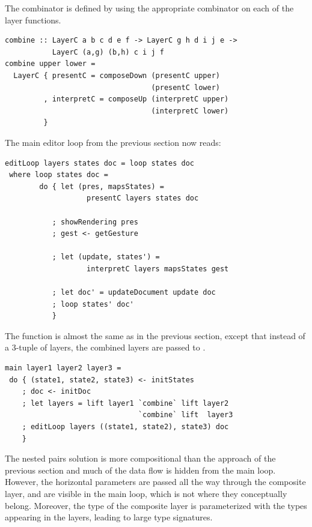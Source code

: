 \documentclass[preprint,natbib]{sigplanconf}
\begin{document}
The  combinator is defined by using the appropriate  combinator on each of the layer functions. 

\begin{small}
\begin{verbatim}
combine :: LayerC a b c d e f -> LayerC g h d i j e -> 
           LayerC (a,g) (b,h) c i j f
combine upper lower =
  LayerC { presentC = composeDown (presentC upper) 
                                  (presentC lower)
         , interpretC = composeUp (interpretC upper) 
                                  (interpretC lower)
         }
\end{verbatim}
\end{small}



The main editor loop from the previous section now reads:
 
\begin{small}
\begin{verbatim}
editLoop layers states doc = loop states doc
 where loop states doc = 
        do { let (pres, mapsStates) = 
                   presentC layers states doc
           
           ; showRendering pres
           ; gest <- getGesture
 
           ; let (update, states') = 
                   interpretC layers mapsStates gest
       
           ; let doc' = updateDocument update doc
           ; loop states' doc'
           }
\end{verbatim}
\end{small}

The  function is almost the same as in the previous section, except that instead of a 3-tuple of layers, the combined layers are passed to . 

\begin{small}
\begin{verbatim}
main layer1 layer2 layer3 = 
 do { (state1, state2, state3) <- initStates
    ; doc <- initDoc 
    ; let layers = lift layer1 `combine` lift layer2 
                               `combine` lift  layer3
    ; editLoop layers ((state1, state2), state3) doc
    }
\end{verbatim}
\end{small}


The nested pairs solution is more compositional than the approach of the previous section and much of the data flow is hidden from the main loop. However, the horizontal parameters are passed all the way through the composite layer, and are visible in the main loop, which is not where they conceptually belong. Moreover, the type of the composite layer is parameterized with the types appearing in the layers, leading to large type signatures.
\end{document}
